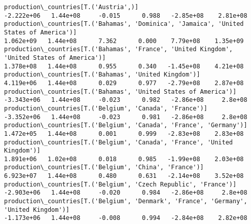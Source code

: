 \documentclass[11pt]{article}
\begin{document}
\begin{Verbatim}[commandchars=\\\{\}]
production\_countries[T.('Austria',)]                                                                                                                                                  -2.222e+06   1.44e+08     -0.015      0.988   -2.85e+08    2.81e+08
production\_countries[T.('Bahamas', 'Dominica', 'Jamaica', 'United States of America')]                                                                                                 1.062e+09   1.44e+08      7.362      0.000    7.79e+08    1.35e+09
production\_countries[T.('Bahamas', 'France', 'United Kingdom', 'United States of America')]                                                                                            1.378e+08   1.44e+08      0.955      0.340   -1.45e+08    4.21e+08
production\_countries[T.('Bahamas', 'United Kingdom')]                                                                                                                                  4.119e+06   1.44e+08      0.029      0.977   -2.79e+08    2.87e+08
production\_countries[T.('Bahamas', 'United States of America')]                                                                                                                       -3.343e+06   1.44e+08     -0.023      0.982   -2.86e+08     2.8e+08
production\_countries[T.('Belgium', 'Canada', 'France')]                                                                                                                               -3.352e+06   1.44e+08     -0.023      0.981   -2.86e+08     2.8e+08
production\_countries[T.('Belgium', 'Canada', 'France', 'Germany')]                                                                                                                     1.472e+05   1.44e+08      0.001      0.999   -2.83e+08    2.83e+08
production\_countries[T.('Belgium', 'Canada', 'France', 'United Kingdom')]                                                                                                              1.891e+06   1.02e+08      0.018      0.985   -1.99e+08    2.03e+08
production\_countries[T.('Belgium', 'China', 'France')]                                                                                                                                 6.923e+07   1.44e+08      0.480      0.631   -2.14e+08    3.52e+08
production\_countries[T.('Belgium', 'Czech Republic', 'France')]                                                                                                                       -2.903e+06   1.44e+08     -0.020      0.984   -2.86e+08     2.8e+08
production\_countries[T.('Belgium', 'Denmark', 'France', 'Germany', 'United Kingdom')]                                                                                                 -1.173e+06   1.44e+08     -0.008      0.994   -2.84e+08    2.82e+08

\end{Verbatim}
\end{document}
